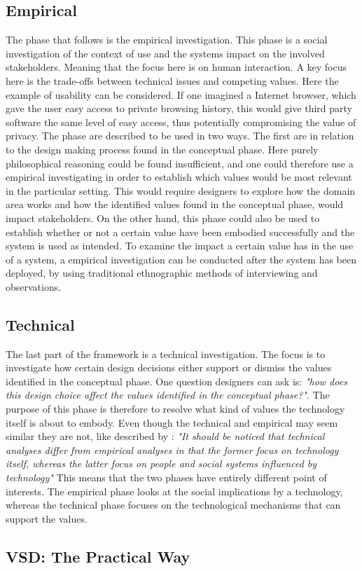 \subsection{Empirical}
The phase that follows is the empirical investigation. This phase is a social investigation of the context of use and the systems impact on the involved stakeholders. Meaning that the focus here is on human interaction. A key focus here is the trade-offs between technical issues and competing values. Here the example of usability can be considered. If one imagined a Internet browser, which gave the user easy access to private browsing history, this would give third party software the same level of easy access, thus potentially compromising the value of privacy.\newline
The phase are described to be used in two ways. The first are in relation to the design making process found in the conceptual phase. Here purely philosophical reasoning could be found insufficient, and one could therefore use a empirical investigating in order to establish which values would be most relevant in the particular setting. This would require designers to explore how the domain area works and how the identified values found in the conceptual phase, would impact stakeholders. \newline
On the other hand, this phase could also be used to establish whether or not a certain value have been embodied successfully and the system is used as intended. To examine the impact a certain value has in the use of a system, a empirical investigation can be conducted after the system has been deployed, by using traditional ethnographic methods of interviewing and observations.

\subsection{Technical}
The last  part of the framework is a technical investigation. The focus is to investigate how certain design decisions either support or dismiss the values identified in the conceptual phase. One question designers can ask is: \textit{"how does this design choice affect the values identified in the conceptual phase?"}. The purpose of this phase is therefore to resolve what kind of values the technology itself is about to embody. Even though the technical and empirical may seem similar they are not, like described by \citet[p. 67]{EthicsAndTechnologyDesign}: \textit{"It should be noticed that technical analyses differ from empirical analyses in that the former focus on technology itself, whereas the latter focus on people and social systems influenced by technology"}\newline
This means that the two phases have entirely different point of interests. The empirical phase looks at the social implications by a technology, whereas the technical phase focuses on the technological mechanisms that can support the values. 


\subsection{VSD: The Practical Way}
